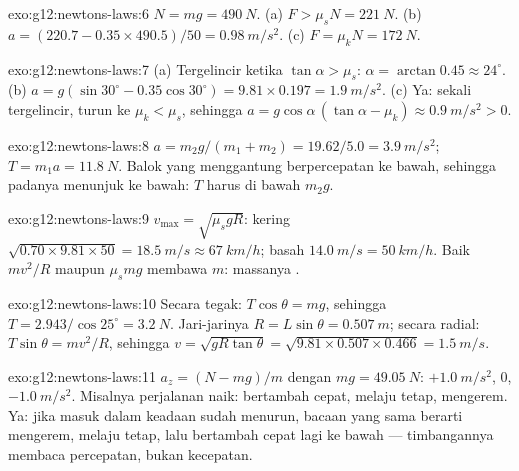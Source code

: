 \begin{solution}{exo:g12:newtons-laws:6}
$N = mg = \qty{490}{N}$. (a) $F > \mu_s N = \qty{221}{N}$.
(b) $a = (220.7 - 0.35 \times 490.5)/50 = \qty{0.98}{m/s^2}$.
(c) $F = \mu_k N = \qty{172}{N}$.
\end{solution}

\begin{solution}{exo:g12:newtons-laws:7}
(a) Tergelincir ketika $\tan\alpha > \mu_s$: $\alpha = \arctan 0.45 \approx
24^\circ$. (b) $a = g(\sin 30^\circ - 0.35\cos 30^\circ) =
9.81 \times 0.197 = \qty{1.9}{m/s^2}$. (c) Ya: sekali tergelincir,
 turun ke $\mu_k < \mu_s$, sehingga
$a = g\cos\alpha\,(\tan\alpha - \mu_k) \approx \qty{0.9}{m/s^2} > 0$.
\end{solution}

\begin{solution}{exo:g12:newtons-laws:8}
$a = m_2 g/(m_1 + m_2) = 19.62/5.0 = \qty{3.9}{m/s^2}$;
$T = m_1 a = \qty{11.8}{N}$. Balok yang menggantung berpercepatan ke bawah,
sehingga  padanya menunjuk ke bawah: $T$ harus di bawah $m_2 g$.
\end{solution}

\begin{solution}{exo:g12:newtons-laws:9}
$v_{\max} = \sqrt{\mu_s g R}$: kering
$\sqrt{0.70 \times 9.81 \times 50} = \qty{18.5}{m/s} \approx
\qty{67}{km/h}$; basah $\qty{14.0}{m/s} = \qty{50}{km/h}$. Baik
$mv^2/R$ maupun $\mu_s mg$ membawa $m$: massanya .
\end{solution}

\begin{solution}{exo:g12:newtons-laws:10}
Secara tegak: $T\cos\theta = mg$, sehingga
$T = 2.943/\cos 25^\circ = \qty{3.2}{N}$. Jari-jarinya $R = L\sin\theta =
\qty{0.507}{m}$; secara radial: $T\sin\theta = mv^2/R$, sehingga
$v = \sqrt{gR\tan\theta} = \sqrt{9.81 \times 0.507 \times 0.466}
= \qty{1.5}{m/s}$.
\end{solution}

\begin{solution}{exo:g12:newtons-laws:11}
$a_z = (N - mg)/m$ dengan $mg = \qty{49.05}{N}$: $+\qty{1.0}{m/s^2}$,
$0$, $-\qty{1.0}{m/s^2}$. Misalnya perjalanan naik: bertambah cepat, melaju tetap,
mengerem. Ya: jika masuk dalam keadaan sudah menurun, bacaan yang sama berarti
mengerem, melaju tetap, lalu bertambah cepat lagi ke bawah --- timbangannya membaca
percepatan, bukan kecepatan.
\end{solution}

